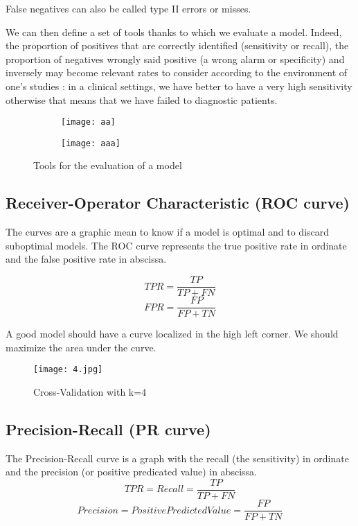 \documentclass[a4paper,12pt]{article}
\begin{document}
False negatives can also be called type II errors or misses.

We can then define a set of tools thanks to which we evaluate a model. Indeed, the proportion of positives that are correctly identified (sensitivity or recall), the proportion of negatives wrongly said positive (a wrong alarm or specificity) and inversely may become relevant rates to consider according to the environment of one's studies : in a clinical settings, we have better to have a very high sensitivity otherwise that means that we have failed to diagnostic patients.   

\begin{figure}[!h]
	\centering
    \begin{subfigure}[b]{0.3\textwidth}
        \centering
        \texttt{[image: aa]}
    \end{subfigure}
    \begin{subfigure}[b]{0.3\textwidth}
        \centering
        \texttt{[image: aaa]}
    \end{subfigure}
    \caption{Tools for the evaluation of a model}
    \label{fig:three graphs}
\end{figure}

\subsection{Receiver-Operator Characteristic (ROC curve)}

The curves are a graphic mean to know if a model is optimal and to discard suboptimal models.
The ROC curve represents the true positive rate in ordinate and the false positive rate in abscissa.

\[TPR = \frac{TP}{TP + FN}\]
\[FPR = \frac{FP}{FP + TN}\]
      
      A good model should have a curve localized in the high left corner. We should maximize the area under the curve.
\begin{figure}[!h]
\centering
\texttt{[image: 4.jpg]}
\caption{\label{fig:1}Cross-Validation with k=4}
\end{figure}

\subsection{Precision-Recall (PR curve)}
 
The Precision-Recall curve is a graph with the recall (the sensitivity) in ordinate and the precision (or positive predicated value) in abscissa. 
\[TPR = Recall = \frac{TP}{TP + FN}\]
\[Precision = Positive Predicted Value = \frac{FP}{FP + TN}\]
\end{document}

